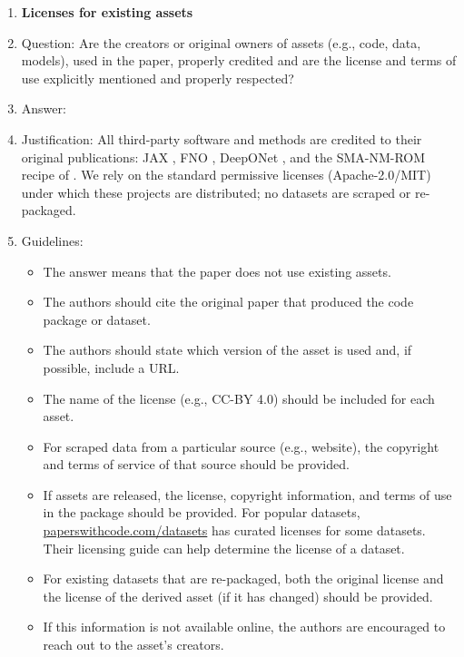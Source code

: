 \begin{enumerate}
\item {\bf Licenses for existing assets}
    \item[] Question: Are the creators or original owners of assets (e.g., code, data, models), used in the paper, properly credited and are the license and terms of use explicitly mentioned and properly respected?
    \item[] Answer: \answerYes{}
    \item[] Justification: All third-party software and methods are credited to their original publications: JAX \citep{Bradbury2018JAX}, FNO \citep{Li2020FNO}, DeepONet \citep{Lu2021DeepONet}, and the SMA-NM-ROM recipe of \citet{KimChoi2022NMROM}. We rely on the standard permissive licenses (Apache-2.0/MIT) under which these projects are distributed; no datasets are scraped or re-packaged.
    \item[] Guidelines:
    \begin{itemize}
        \item The answer \answerNA{} means that the paper does not use existing assets.
        \item The authors should cite the original paper that produced the code package or dataset.
        \item The authors should state which version of the asset is used and, if possible, include a URL.
        \item The name of the license (e.g., CC-BY 4.0) should be included for each asset.
        \item For scraped data from a particular source (e.g., website), the copyright and terms of service of that source should be provided.
        \item If assets are released, the license, copyright information, and terms of use in the package should be provided. For popular datasets, \url{paperswithcode.com/datasets} has curated licenses for some datasets. Their licensing guide can help determine the license of a dataset.
        \item For existing datasets that are re-packaged, both the original license and the license of the derived asset (if it has changed) should be provided.
        \item If this information is not available online, the authors are encouraged to reach out to the asset's creators.
    \end{itemize}


\end{enumerate}
